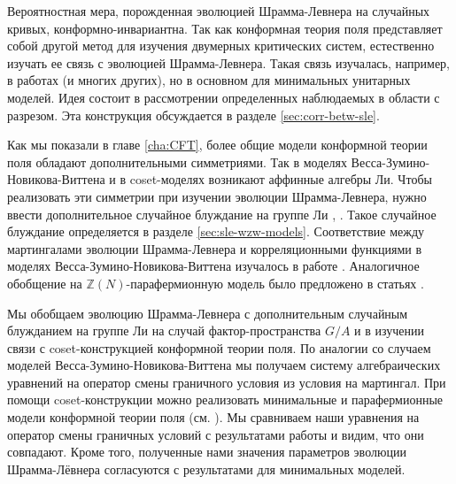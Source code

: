 Вероятностная мера, порожденная эволюцией Шрамма-Левнера на случайных кривых, конформно-инвариантна. Так как конформная теория поля представляет собой другой метод для изучения двумерных критических систем, естественно изучать ее связь с эволюцией Шрамма-Левнера. Такая связь изучалась, например, в работах \cite{bauer2004conformal,bauer2004cfts,bauer2003sle,bauer2002sle} (и многих других), но в основном для минимальных унитарных моделей. 
Идея состоит в рассмотрении определенных наблюдаемых в области с разрезом. Эта конструкция обсуждается в разделе \ref{sec:corr-betw-sle}. 

Как мы показали в главе \ref{cha:CFT}, более общие модели конформной теории поля обладают дополнительными симметриями. Так в моделях Весса-Зумино-Новикова-Виттена и в coset-моделях возникают аффинные алгебры Ли.  Чтобы реализовать эти симметрии при изучении эволюции Шрамма-Левнера, нужно ввести дополнительное случайное блуждание на группе Ли \cite{bettelheim2005stochastic}, \cite{Rasmussen:2004xr}. Такое случайное блуждание определяется в разделе \ref{sec:sle-wzw-models}. Соответствие между мартингалами эволюции Шрамма-Левнера и корреляционными функциями в моделях Весса-Зумино-Новикова-Виттена изучалось в работе \cite{alekseev2010sle}. Аналогичное обобщение на $\mathbb{Z}(N)$-парафермионную модель было предложено в статьях \cite{santachiara2008sle,picco2008numerical}. 

Мы обобщаем эволюцию Шрамма-Левнера с дополнительным случайным блужданием на группе Ли на случай фактор-пространства  $G/A$ и в изучении связи с coset-конструкцией конформной теории поля. По аналогии со случаем моделей Весса-Зумино-Новикова-Виттена мы получаем систему алгебраических уравнений на оператор смены граничного условия из условия на мартингал. 
При помощи coset-конструкции можно реализовать минимальные и парафермионные модели конформной теории поля (см. \cite{difrancesco1997cft}).  Мы сравниваем наши уравнения на оператор смены граничных условий с результатами работы \cite{santachiara2008sle} и видим, что они совпадают. Кроме того, полученные нами значения параметров эволюции Шрамма-Лёвнера согласуются с результатами для минимальных моделей.


